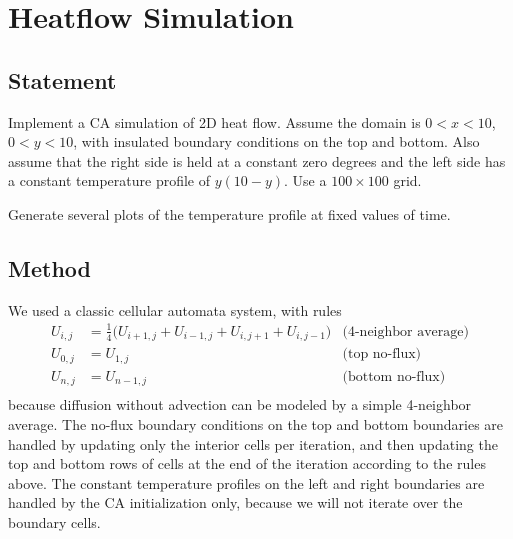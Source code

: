 \section{Heatflow Simulation}

\subsection{Statement}
Implement a CA simulation of 2D heat flow.
Assume the domain is $0 < x < 10$, $0 < y < 10$, with insulated boundary conditions on the top and bottom.
Also assume that the right side is held at a constant zero degrees and the left side has a constant temperature profile of $y(10 - y)$.
Use a $100 \times 100$ grid.

Generate several plots of the temperature profile at fixed values of time.

\subsection{Method}
We used a classic cellular automata system, with rules
\begin{align*}
    U_{i, j} & = \frac{1}{4}\big( U_{i + 1, j} + U_{i - 1, j} + U_{i, j + 1} + U_{i, j - 1} \big) & \text{(4-neighbor average)} \\
    U_{0, j} & = U_{1, j}                                                                         & \text{(top no-flux)}        \\
    U_{n, j} & = U_{n - 1, j}                                                                     & \text{(bottom no-flux)}     \\
\end{align*}
because diffusion without advection can be modeled by a simple 4-neighbor average.
The no-flux boundary conditions on the top and bottom boundaries are handled by updating only the interior cells per iteration, and then updating the top and bottom rows of cells at the end of the iteration according to the rules above.
The constant temperature profiles on the left and right boundaries are handled by the CA initialization only, because we will not iterate over the boundary cells.

